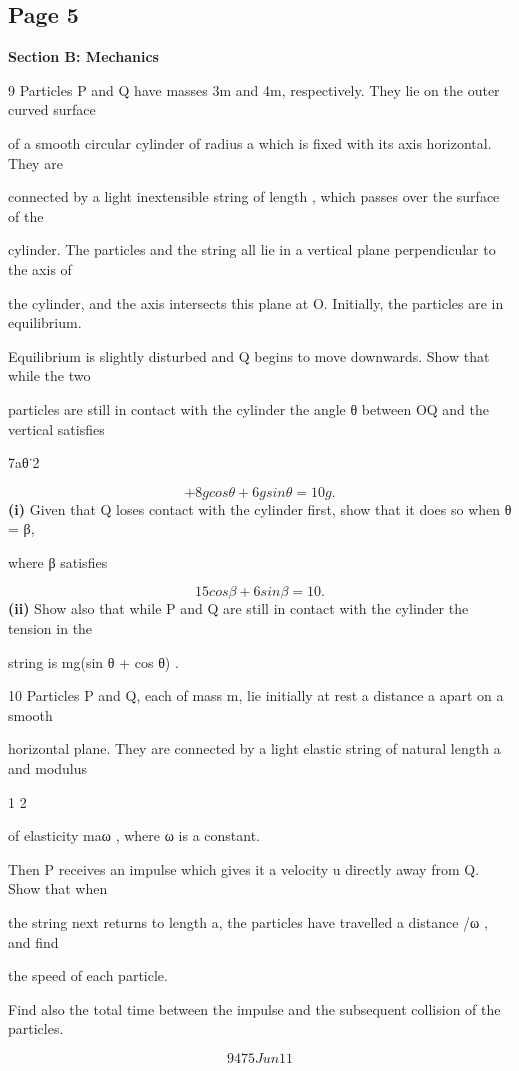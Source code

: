 \documentclass[12pt]{article}
\begin{document}
\subsection*{Page 5}
\begin{flushleft}
\bigskip\textbf{Section B: Mechanics}\par
9 Particles P and Q have masses 3m and 4m, respectively. They lie on the outer curved surface\par
of a smooth circular cylinder of radius a which is fixed with its axis horizontal. They are\par
connected by a light inextensible string of length \pia, which passes over the surface of the\par
cylinder. The particles and the string all lie in a vertical plane perpendicular to the axis of\par
the cylinder, and the axis intersects this plane at O. Initially, the particles are in equilibrium.\par
Equilibrium is slightly disturbed and Q begins to move downwards. Show that while the two\par
particles are still in contact with the cylinder the angle θ between OQ and the vertical satisfies\par
7aθ˙2\par
\[+ 8g cos θ + 6g sin θ = 10g .\]
\textbf{(i)} Given that Q loses contact with the cylinder first, show that it does so when θ = β,\par
where β satisfies\par
\[15 cos β + 6 sin β = 10.\]
\textbf{(ii)} Show also that while P and Q are still in contact with the cylinder the tension in the\par
string is mg(sin θ + cos θ) .\par
10 Particles P and Q, each of mass m, lie initially at rest a distance a apart on a smooth\par
horizontal plane. They are connected by a light elastic string of natural length a and modulus\par
1 2\par
of elasticity maω , where ω is a constant.\par
Then P receives an impulse which gives it a velocity u directly away from Q. Show that when\par
the string next returns to length a, the particles have travelled a distance \piu/ω , and find\par
the speed of each particle.\par
Find also the total time between the impulse and the subsequent collision of the particles.\par
\[9475 Jun11\]
\end{flushleft}
\end{document}
